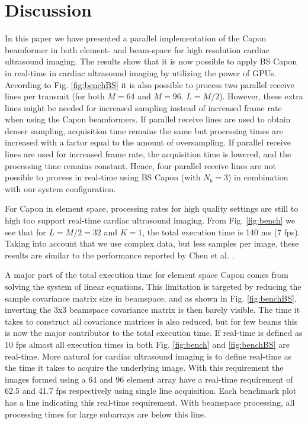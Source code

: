\documentclass[journal]{IEEEtran}
\begin{document}
\section{Discussion}\label{sec:dis}
In this paper we have presented a parallel implementation of the Capon beamformer in both element- and beam-space for high resolution cardiac ultrasound imaging. The results show that it is now possible to apply BS Capon in real-time in cardiac ultrasound imaging by utilizing the power of GPUs. According to Fig. \ref{fig:benchBS} it is also possible to process two parallel receive lines per transmit (for both $M=64$ and $M=96$. $L=M/2$). However, these extra lines might be needed for increased sampling instead of increased frame rate when using the Capon beamformers. If parallel receive lines are used to obtain denser sampling, acquisition time remains the same but processing times are increased with a factor equal to the amount of oversampling. If parallel receive lines are used for increased frame rate, the acquisition time is lowered, and the processing time remains constant. Hence, four parallel receive lines are not possible to process in real-time using BS Capon (with $N_b=3$) in combination with our system configuration.

For Capon in element space, processing rates for high quality settings are still to high too support real-time cardiac ultrasound imaging. From Fig. \ref{fig:bench} we see that for $L = M/2 = 32$ and $K=1$, the total execution time is 140 ms (7 fps). Taking into account that we use complex data, but less samples per image, these results are similar to the performance reported by Chen et al. \cite{Chen2011}.

A major part of the total execution time for element space Capon comes from solving the system of linear equations. This limitation is targeted by reducing the sample covariance matrix size in beamspace, and as shown in Fig. \ref{fig:benchBS}, inverting the 3x3 beamspace covariance matrix is then barely visible. The time it takes to construct all covariance matrices is also reduced, but for few beams this is now the major contributor to the total execution time. If real-time is defined as 10 fps \cite{Chen2011} almost all execution times in both Fig. \ref{fig:bench} and \ref{fig:benchBS} are real-time. More natural for cardiac ultrasound imaging is to define real-time as the time it takes to acquire the underlying image. With this requirement the images formed using a 64 and 96 element array have a real-time requirement of 62.5 and 41.7 fps respectively using single line acquisition. Each benchmark plot has a line indicating this real-time requirement. With beamspace processing, all processing times for large subarrays are below this line.
\end{document}
